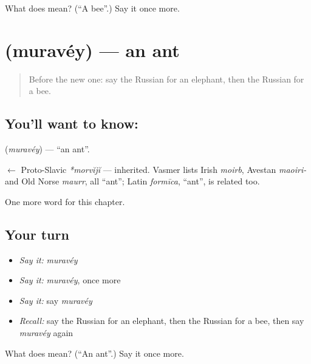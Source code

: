 \begin{tcolorbox}[breakable,colback=teal!4,colframe=teal!35!black,title={Before you move on}]
What does  mean? (\textquotedblleft{}A bee\textquotedblright{}.) Say it once more.
\end{tcolorbox}
\section[\texorpdfstring{\ru{муравей} (muravéy)}{муравей (muravéy)}]{ (muravéy) — an ant}

\label{lesson:RU-C120-ant}



\begin{quote}
Before the new one: say the Russian for an elephant, then the Russian for a bee.
\end{quote}

\subsection*{You'll want to know: }
\textbf{} (\emph{muravéy}) — \textquotedblleft{}an ant\textquotedblright{}.

\begin{cousinweb}
\textbf{} $\leftarrow$ Proto-Slavic \emph{*morvĭjĭ} — inherited. Vasmer lists Irish \emph{moirb}, Avestan \emph{maoiri-} and Old Norse \emph{maurr}, all \textquotedblleft{}ant\textquotedblright{}; Latin \emph{formīca}, \textquotedblleft{}ant\textquotedblright{}, is related too.
\end{cousinweb}

\begin{grammarlens}[title={What you've built}]
One more word for this chapter.
\end{grammarlens}

\subsection*{Your turn}
\begin{itemize}
\raggedright
  \item \emph{Say it:} \emph{muravéy}
  \item \emph{Say it:} \emph{muravéy}, once more
  \item \emph{Say it:} say \emph{muravéy}
  \item \emph{Recall:} say the Russian for an elephant, then the Russian for a bee, then say \emph{muravéy} again
\end{itemize}

\begin{tcolorbox}[breakable,colback=teal!4,colframe=teal!35!black,title={Before you move on}]
What does  mean? (\textquotedblleft{}An ant\textquotedblright{}.) Say it once more.
\end{tcolorbox}
